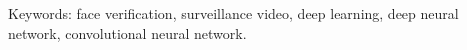 Keywords: face verification, surveillance video, deep learning, deep neural network, convolutional neural network.


\setlength{\parskip}{0pt} 
\newpage
{}
\tableofcontents


\newpage
{}
\listoffigures






\setlength{\parskip}{12pt}